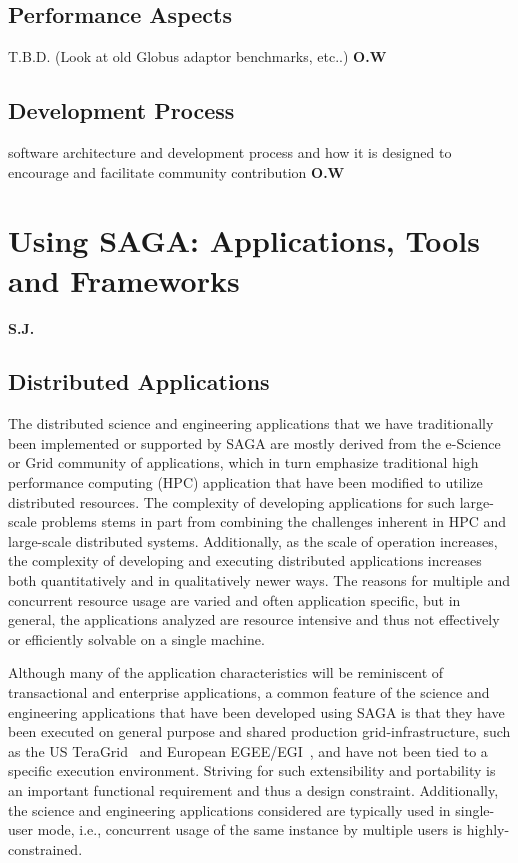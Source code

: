 \documentclass[a4paper,10pt]{article}
\begin{document}
 
 \subsection{Performance Aspects}
 T.B.D. (Look at old Globus adaptor benchmarks, etc..) \textbf{O.W}

 \subsection{Development Process}
 software architecture and development process and how it is designed to encourage and facilitate community contribution \textbf{O.W}


\section{Using SAGA: Applications, Tools and Frameworks} \textbf{S.J.}

\subsection{Distributed Applications}

 The distributed science and engineering applications that we have
 traditionally been implemented or supported by SAGA are mostly
 derived from the e-Science or Grid community of applications, which
 in turn emphasize traditional high performance computing (HPC)
 application that have been modified to utilize distributed resources.
 The complexity of developing applications for such large-scale
 problems stems in part from combining the challenges inherent in HPC
 and large-scale distributed systems.  Additionally, as the scale of
 operation increases, the complexity of developing and executing
 distributed applications increases both quantitatively and in
 qualitatively newer ways.  The reasons for multiple and concurrent
 resource usage are varied and often application specific, but in
 general, the applications analyzed are resource intensive and thus
 not effectively or efficiently solvable on a single machine.

 Although many of the application characteristics will be reminiscent
 of transactional and enterprise applications, a common feature of the
 science and engineering applications that have been developed using
 SAGA is that they have been executed on general purpose and shared
 production grid-infrastructure, such as the US
 TeraGrid~\cite{teragrid} and European EGEE/EGI~\cite{egi}, and have
 not been tied to a specific execution environment. Striving for such
 extensibility and portability is an important functional requirement
 and thus a design constraint. Additionally, the science and
 engineering applications considered are typically used in single-user
 mode, i.e., concurrent usage of the same instance by multiple users
 is highly-constrained.
\end{document}
